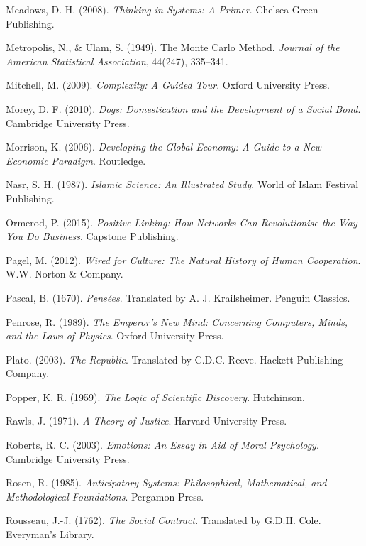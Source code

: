 \documentclass[twocolumn]{article}
\begin{document}
\begin{thebibliography}{99}
Meadows, D. H. (2008). \textit{Thinking in Systems: A Primer}. Chelsea Green Publishing.

Metropolis, N., \& Ulam, S. (1949). The Monte Carlo Method. \textit{Journal of the American Statistical Association}, 44(247), 335–341.

Mitchell, M. (2009). \textit{Complexity: A Guided Tour}. Oxford University Press.

Morey, D. F. (2010). \textit{Dogs: Domestication and the Development of a Social Bond}. Cambridge University Press.

Morrison, K. (2006). \textit{Developing the Global Economy: A Guide to a New Economic Paradigm}. Routledge.

Nasr, S. H. (1987). \textit{Islamic Science: An Illustrated Study}. World of Islam Festival Publishing.

Ormerod, P. (2015). \textit{Positive Linking: How Networks Can Revolutionise the Way You Do Business}. Capstone Publishing.

Pagel, M. (2012). \textit{Wired for Culture: The Natural History of Human Cooperation}. W.W. Norton \& Company.

Pascal, B. (1670). \textit{Pensées}. Translated by A. J. Krailsheimer. Penguin Classics.

Penrose, R. (1989). \textit{The Emperor’s New Mind: Concerning Computers, Minds, and the Laws of Physics}. Oxford University Press.

Plato. (2003). \textit{The Republic}. Translated by C.D.C. Reeve. Hackett Publishing Company.

Popper, K. R. (1959). \textit{The Logic of Scientific Discovery}. Hutchinson.

Rawls, J. (1971). \textit{A Theory of Justice}. Harvard University Press.

Roberts, R. C. (2003). \textit{Emotions: An Essay in Aid of Moral Psychology}. Cambridge University Press.

Rosen, R. (1985). \textit{Anticipatory Systems: Philosophical, Mathematical, and Methodological Foundations}. Pergamon Press.

Rousseau, J.-J. (1762). \textit{The Social Contract}. Translated by G.D.H. Cole. Everyman’s Library.


\end{thebibliography}
\end{document}
